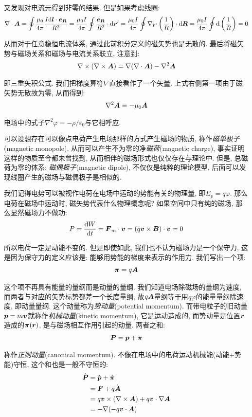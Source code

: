 又发现对电流元得到非零的结果. 但是如果考虑线圈:
\[\nabla\cdot\boldsymbol{A}=\oint \frac{\mu_0}{4\pi}\frac{I\textrm{d} \boldsymbol{l}\cdot \boldsymbol{e}_{\boldsymbol{R}}}{R^2}=\frac{\mu_0 I}{4\pi}\oint \frac{\boldsymbol{e}_{\boldsymbol{R}}}{R^2}\cdot \textrm{d} \boldsymbol{r}'=\frac{\mu_0 I}{4\pi}\oint \nabla_{\boldsymbol{r}'}\left(\frac{1}{R}\right)\cdot \textrm{d} \boldsymbol{R}=\frac{\mu_0 I}{4\pi}\oint \textrm{d}\left(\frac{1}{R}\right)=0\]

从而对于任意稳恒电流体系, 通过此前积分定义的磁矢势也是无散的. 最后将磁矢势与磁场关系和磁场与电流关系联立, 注意到:
\[\nabla\times(\nabla\times \boldsymbol{A})=\nabla(\nabla\cdot\boldsymbol{A})-\nabla^2\boldsymbol{A}\]

即三重矢积公式. 我们把梯度算符$\nabla$直接看作了一个矢量. 上式右侧第一项由于磁矢势无散故为零, 从而得到:
\[\nabla^2\boldsymbol{A}=-\mu_0\boldsymbol{A}\]

电场中的式子$\nabla^2\varphi=-\rho/\varepsilon_0$与它相呼应.


可以设想存在可以像点电荷产生电场那样的方式产生磁场的物质, 称作\emph{磁单极子}(magnetic monopole), 从而可以产生不为零的净\emph{磁荷}(magnetic charge), 事实证明这样的物质至今都未曾找到, 从而相伴的磁场形式也仅仅存在与理论中. 但是, 总磁荷为零的体系: \emph{磁偶极子}(magnetic dipole), 不仅仅是纯粹的理论模型, 后面可以发现线圈产生的磁场与磁偶极子是相似的.

我们记得电势可以被视作电荷在电场中运动的势能有关的物理量, 即$E_p=q\varphi$. 那么电荷在磁场中运动时, 磁矢势代表什么物理概念呢? 如果空间中只有纯的磁场, 那么显然磁场力不做功:
\[P=\frac{\textrm{d} W}{\textrm{d} t}=\boldsymbol{F}_m\cdot \boldsymbol{v}=(q\boldsymbol{v}\times\boldsymbol{B})\cdot\boldsymbol{v}=0\]

所以电荷一定是动能不变的. 但是即使如此, 我们也不认为磁场力是一个保守力, 这是因为保守力的定义应该是: 能够用势能的梯度来表示的作用力. 我们写出一个项:
\[\boldsymbol{\pi}=q\boldsymbol{A}\]

这个项不再具有能量的量纲而是动量的量纲. 我们知道电场除磁场的量纲为速度, 而两者与对应的矢势标势都差一个长度量纲, 故$q\boldsymbol{A}$量纲等于用$q\varphi$的能量量纲除速度, 即动量量纲. 这个动量称为\emph{势动量}(potential momentum). 而带电粒子的旧动量$\boldsymbol{p}=m\boldsymbol{v}$就称作\emph{机械动量}(kinetic momentum), 它是运动造成的, 而势动量是位置$\boldsymbol{r}$造成的$\boldsymbol{\pi}(\boldsymbol{r})$, 是与磁场相互作用引起的动量. 两者之和:
\[\boldsymbol{P}=\boldsymbol{p}+\boldsymbol{\pi}\]

称作\emph{正则动量}(canonical momentum). 不像在电场中的电荷运动机械能(动能+势能)守恒, 这个和也是一般不守恒的:
\begin{align*}
\dot{\boldsymbol{P}}	&=\dot{\boldsymbol{p}}+\dot{\boldsymbol{\pi}}\\
				&=\boldsymbol{F}+q\dot{\boldsymbol{A}}\\
				&=q\boldsymbol{v}\times(\nabla\times \boldsymbol{A})+q\boldsymbol{v}\cdot\nabla\boldsymbol{A}\\
				&=-\nabla(-q\boldsymbol{v}\cdot\boldsymbol{A})
\end{align*}

